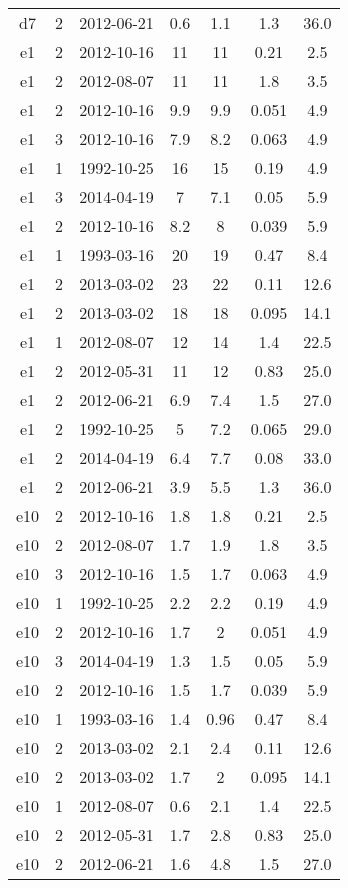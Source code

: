 \begin{table*}[htp]
\begin{tabular}{ccccccc}
d7 & 2 & 2012-06-21 & 0.6 & 1.1 & 1.3 & 36.0 \\
e1 & 2 & 2012-10-16 & 11 & 11 & 0.21 & 2.5 \\
e1 & 2 & 2012-08-07 & 11 & 11 & 1.8 & 3.5 \\
e1 & 2 & 2012-10-16 & 9.9 & 9.9 & 0.051 & 4.9 \\
e1 & 3 & 2012-10-16 & 7.9 & 8.2 & 0.063 & 4.9 \\
e1 & 1 & 1992-10-25 & 16 & 15 & 0.19 & 4.9 \\
e1 & 3 & 2014-04-19 & 7 & 7.1 & 0.05 & 5.9 \\
e1 & 2 & 2012-10-16 & 8.2 & 8 & 0.039 & 5.9 \\
e1 & 1 & 1993-03-16 & 20 & 19 & 0.47 & 8.4 \\
e1 & 2 & 2013-03-02 & 23 & 22 & 0.11 & 12.6 \\
e1 & 2 & 2013-03-02 & 18 & 18 & 0.095 & 14.1 \\
e1 & 1 & 2012-08-07 & 12 & 14 & 1.4 & 22.5 \\
e1 & 2 & 2012-05-31 & 11 & 12 & 0.83 & 25.0 \\
e1 & 2 & 2012-06-21 & 6.9 & 7.4 & 1.5 & 27.0 \\
e1 & 2 & 1992-10-25 & 5 & 7.2 & 0.065 & 29.0 \\
e1 & 2 & 2014-04-19 & 6.4 & 7.7 & 0.08 & 33.0 \\
e1 & 2 & 2012-06-21 & 3.9 & 5.5 & 1.3 & 36.0 \\
e10 & 2 & 2012-10-16 & 1.8 & 1.8 & 0.21 & 2.5 \\
e10 & 2 & 2012-08-07 & 1.7 & 1.9 & 1.8 & 3.5 \\
e10 & 3 & 2012-10-16 & 1.5 & 1.7 & 0.063 & 4.9 \\
e10 & 1 & 1992-10-25 & 2.2 & 2.2 & 0.19 & 4.9 \\
e10 & 2 & 2012-10-16 & 1.7 & 2 & 0.051 & 4.9 \\
e10 & 3 & 2014-04-19 & 1.3 & 1.5 & 0.05 & 5.9 \\
e10 & 2 & 2012-10-16 & 1.5 & 1.7 & 0.039 & 5.9 \\
e10 & 1 & 1993-03-16 & 1.4 & 0.96 & 0.47 & 8.4 \\
e10 & 2 & 2013-03-02 & 2.1 & 2.4 & 0.11 & 12.6 \\
e10 & 2 & 2013-03-02 & 1.7 & 2 & 0.095 & 14.1 \\
e10 & 1 & 2012-08-07 & 0.6 & 2.1 & 1.4 & 22.5 \\
e10 & 2 & 2012-05-31 & 1.7 & 2.8 & 0.83 & 25.0 \\
e10 & 2 & 2012-06-21 & 1.6 & 4.8 & 1.5 & 27.0 \\

\end{tabular}
\end{table*}
